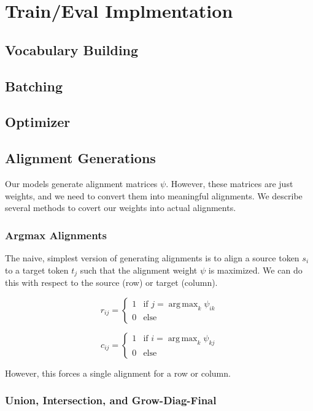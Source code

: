 \documentclass[twoside,twocolumn]{article}
\DeclareMathOperator*{\argmax}{arg\,max}
\begin{document}
\section{Train/Eval Implmentation}
\subsection{Vocabulary Building}
\subsection{Batching}
\subsection{Optimizer}
\subsection{Alignment Generations}
Our models generate alignment matrices $\psi$. However, these matrices
are just weights, and we need to convert them into meaningful alignments.
We describe several methods to covert our weights into actual alignments.

\subsubsection{Argmax Alignments}
The naive, simplest version of generating alignments is to align a source token
$s_i$ to a target token $t_j$ such that the alignment weight $\psi$ is
maximized. We can do this with respect to the source (row) or target (column).

\begin{equation}
  r_{ij} = \begin{cases}
    1 & \text{if } j=\argmax_k \psi_{ik} \\
    0 & \text{else}
  \end{cases}
\end{equation}

\begin{equation}
  c_{ij} = \begin{cases}
    1 & \text{if } i=\argmax_k \psi_{kj} \\
    0 & \text{else}
  \end{cases}
\end{equation}

However, this forces a single alignment for a row or column.

\subsubsection{Union, Intersection, and Grow-Diag-Final}
\end{document}
